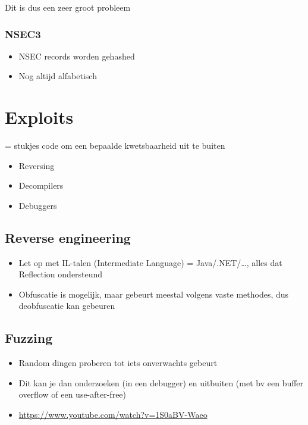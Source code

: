 \documentclass{article}
\begin{document}
Dit is dus een zeer groot probleem

\subsubsection{NSEC3}

\begin{itemize}
    \item NSEC records worden gehashed
    \item Nog altijd alfabetisch
\end{itemize}

\section{Exploits}

= stukjes code om een bepaalde kwetsbaarheid uit te buiten

\begin{itemize}
    \item Reversing 
    \item Decompilers
    \item Debuggers
\end{itemize}

\subsection{Reverse engineering}

\begin{itemize}
    \item Let op met IL-talen (Intermediate Language) = Java/.NET/\dots, alles dat Reflection ondersteund
    \item Obfuscatie is mogelijk, maar gebeurt meestal volgens vaste methodes, dus deobfuscatie kan gebeuren 
\end{itemize}

\subsection{Fuzzing}

\begin{itemize}
    \item Random dingen proberen tot iets onverwachts gebeurt
    \item Dit kan je dan onderzoeken (in een debugger) en uitbuiten (met bv een buffer overflow of een use-after-free)
    \item \url{https://www.youtube.com/watch?v=1S0aBV-Waeo}
\end{itemize}
\end{document}
